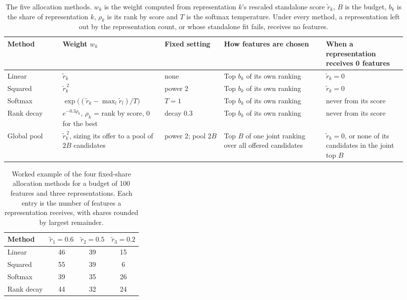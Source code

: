 \begin{table}[htbp]
\centering
\small
\begin{adjustbox}{max width=\textwidth,max totalheight=0.78\textheight}
\begin{tabular}{@{}P{0.13\linewidth}P{0.24\linewidth}P{0.14\linewidth}P{0.24\linewidth}P{0.19\linewidth}@{}}
\toprule
Method & Weight $w_k$ & Fixed setting & How features are chosen & When a representation receives 0 features \\
\midrule
Linear & $\tilde r_k$ & none & Top $b_k$ of its own ranking & $\tilde r_k = 0$ \\
Squared & $\tilde r_k^{\,2}$ & power 2 & Top $b_k$ of its own ranking & $\tilde r_k = 0$ \\
Softmax & $\exp\big((\tilde r_k - \max_l \tilde r_l)/T\big)$ & $T = 1$ & Top $b_k$ of its own ranking & never from its score \\
Rank decay & $e^{-0.3\rho_k}$, $\rho_k$ = rank by score, 0 for the best & decay 0.3 & Top $b_k$ of its own ranking & never from its score \\
Global pool & $\tilde r_k^{\,2}$, sizing its offer to a pool of $2B$ candidates & power 2; pool $2B$ & Top $B$ of one joint ranking over all offered candidates & $\tilde r_k = 0$, or none of its candidates in the joint top $B$ \\
\bottomrule
\end{tabular}
\end{adjustbox}
\caption[The five allocation methods searched.]{The five allocation methods. $w_k$ is the weight computed from representation $k$'s rescaled standalone score $\tilde r_k$, $B$ is the budget, $b_k$ is the share of representation $k$, $\rho_k$ is its rank by score and $T$ is the softmax temperature. Under every method, a representation left out by the representation count, or whose standalone fit fails, receives no features.}
\label{tab:alloc_methods}
\end{table}

\begin{table}[htbp]
\centering
\begin{adjustbox}{max width=\textwidth,max totalheight=0.78\textheight}
\begin{tabular}{@{}lccc@{}}
\toprule
Method & $\tilde r_1 = 0.6$ & $\tilde r_2 = 0.5$ & $\tilde r_3 = 0.2$ \\
\midrule
Linear & 46 & 39 & 15 \\
Squared & 55 & 39 & 6 \\
Softmax & 39 & 35 & 26 \\
Rank decay & 44 & 32 & 24 \\
\bottomrule
\end{tabular}
\end{adjustbox}
\caption[Worked example of the four fixed-share allocation methods.]{Worked example of the four fixed-share allocation methods for a budget of 100 features and three representations. Each entry is the number of features a representation receives, with shares rounded by largest remainder.}
\label{tab:alloc_example}
\end{table}

